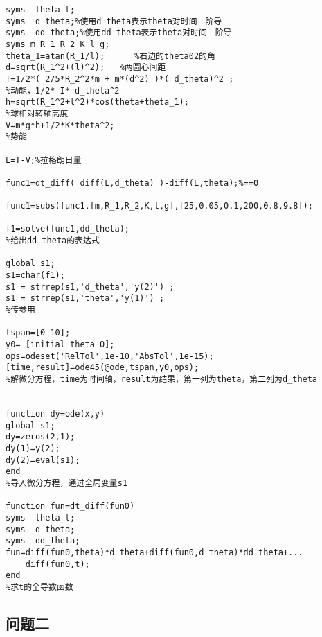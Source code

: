 \documentclass[a4paper,c5size,twoside,UTF8]{ctexart} %
\numberwithin{equation}{section}   %
\begin{document}
\begin{lstlisting}
syms  theta t;
syms  d_theta;%使用d_theta表示theta对时间一阶导
syms  dd_theta;%使用dd_theta表示theta对时间二阶导
syms m R_1 R_2 K l g;
theta_1=atan(R_1/l);      %右边的theta02的角
d=sqrt(R_1^2+(l)^2);   %两圆心间距
T=1/2*( 2/5*R_2^2*m + m*(d^2) )*( d_theta)^2 ;
%动能，1/2* I* d_theta^2
h=sqrt(R_1^2+l^2)*cos(theta+theta_1);
%球相对转轴高度
V=m*g*h+1/2*K*theta^2;
%势能

L=T-V;%拉格朗日量

func1=dt_diff( diff(L,d_theta) )-diff(L,theta);%==0

func1=subs(func1,[m,R_1,R_2,K,l,g],[25,0.05,0.1,200,0.8,9.8]);

f1=solve(func1,dd_theta);
%给出dd_theta的表达式

global s1;
s1=char(f1);
s1 = strrep(s1,'d_theta','y(2)') ;
s1 = strrep(s1,'theta','y(1)') ;
%传参用

tspan=[0 10];
y0= [initial_theta 0];
ops=odeset('RelTol',1e-10,'AbsTol',1e-15);
[time,result]=ode45(@ode,tspan,y0,ops);
%解微分方程，time为时间轴，result为结果，第一列为theta，第二列为d_theta


function dy=ode(x,y)
global s1;
dy=zeros(2,1);
dy(1)=y(2);
dy(2)=eval(s1);
end
%导入微分方程，通过全局变量s1

function fun=dt_diff(fun0)
syms  theta t;
syms  d_theta;
syms  dd_theta;
fun=diff(fun0,theta)*d_theta+diff(fun0,d_theta)*dd_theta+...
    diff(fun0,t);
end
%求t的全导数函数

\end{lstlisting}

\subsection{问题二}
\end{document}
